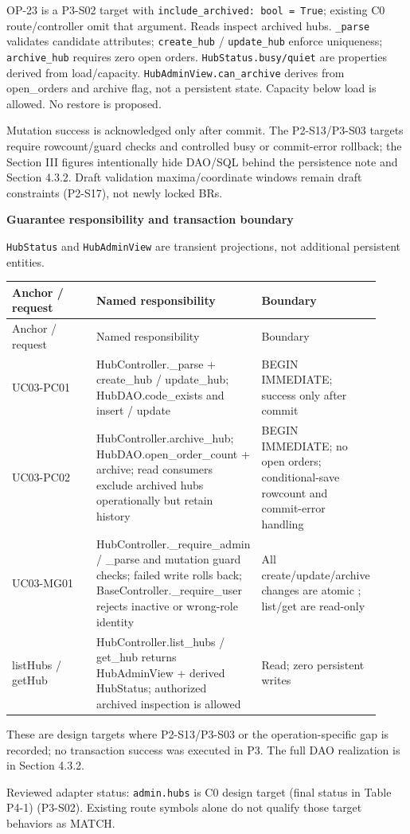 OP-23 is a P3-S02 target with \texttt{include\_\allowbreak{}archived: bool = True}; existing C0 route/controller omit that argument. Reads inspect archived hubs. \texttt{\_\allowbreak{}parse} validates candidate attributes; \texttt{create\_\allowbreak{}hub} / \texttt{update\_\allowbreak{}hub} enforce uniqueness; \texttt{archive\_\allowbreak{}hub} requires zero open orders. \texttt{HubStatus.\allowbreak{}busy/\allowbreak{}quiet} are properties derived from load/capacity. \texttt{HubAdminView.\allowbreak{}can\_\allowbreak{}archive} derives from open\_orders and archive flag, not a persistent state. Capacity below load is allowed. No restore is proposed.

Mutation success is acknowledged only after commit. The P2-S13/P3-S03 targets require rowcount/guard checks and controlled busy or commit-error rollback; the Section III figures intentionally hide DAO/SQL behind the persistence note and Section 4.3.2. Draft validation maxima/coordinate windows remain draft constraints (P2-S17), not newly locked BRs.

\textbf{Guarantee responsibility and transaction boundary}

\texttt{HubStatus} and \texttt{HubAdminView} are transient projections, not additional persistent entities.

\begin{longtable}{>{\raggedright\arraybackslash}p{0.3067\linewidth}>{\raggedright\arraybackslash}p{0.3067\linewidth}>{\raggedright\arraybackslash}p{0.3067\linewidth}}
Anchor / request & Named responsibility & Boundary \\
\hline\endfirsthead
Anchor / request & Named responsibility & Boundary \\
\hline\endhead
UC03-PC01 & HubController.\_parse + create\_hub / update\_hub; HubDAO.code\_exists and insert / update & BEGIN IMMEDIATE; success only after commit \\
UC03-PC02 & HubController.archive\_hub; HubDAO.open\_order\_count + archive; read consumers exclude archived hubs operationally but retain history & BEGIN IMMEDIATE; no open orders; conditional-save rowcount and commit-error handling \\
UC03-MG01 & HubController.\_require\_admin / \_parse and mutation guard checks; failed write rolls back; BaseController.\_require\_user rejects inactive or wrong-role identity & All create/update/archive changes are atomic ; list/get are read-only \\
listHubs / getHub & HubController.list\_hubs / get\_hub returns HubAdminView + derived HubStatus; authorized archived inspection is allowed & Read; zero persistent writes \\
\end{longtable}
These are design targets where P2-S13/P3-S03 or the operation-specific gap is recorded; no transaction success was executed in P3. The full DAO realization is in Section 4.3.2.

Reviewed adapter status: \texttt{admin.\allowbreak{}hubs} is C0 design target (final status in Table P4-1)  (P3-S02). Existing route symbols alone do not qualify those target behaviors as MATCH.
